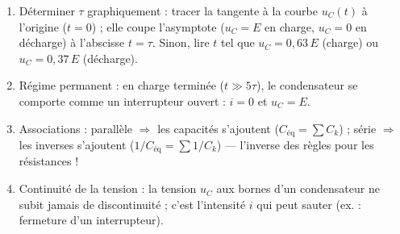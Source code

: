 \documentclass[11pt]{article}
\newcommand{\cle}[1]{{\popxbold\color{popdark}#1}}
\begin{document}
\begin{methode}
\begin{enumerate}
  \item \cle{Déterminer $\tau$ graphiquement} : tracer la tangente à la courbe $u_C(t)$ à l'origine ($t=0$) ; elle coupe l'asymptote ($u_C = E$ en charge, $u_C = 0$ en décharge) à l'abscisse $t = \tau$. Sinon, lire $t$ tel que $u_C = 0{,}63\,E$ (charge) ou $u_C = 0{,}37\,E$ (décharge).
  \item \cle{Régime permanent} : en charge terminée ($t \gg 5\tau$), le condensateur se comporte comme un interrupteur ouvert : $i = 0$ et $u_C = E$.
  \item \cle{Associations} : parallèle $\Rightarrow$ les capacités s'ajoutent ($C_{\text{éq}} = \sum C_k$) ; série $\Rightarrow$ les inverses s'ajoutent ($1/C_{\text{éq}} = \sum 1/C_k$) — l'inverse des règles pour les résistances !
  \item \cle{Continuité de la tension} : la tension $u_C$ aux bornes d'un condensateur ne subit jamais de discontinuité ; c'est l'intensité $i$ qui peut sauter (ex. : fermeture d'un interrupteur).
\end{enumerate}
\end{methode}
\end{document}
